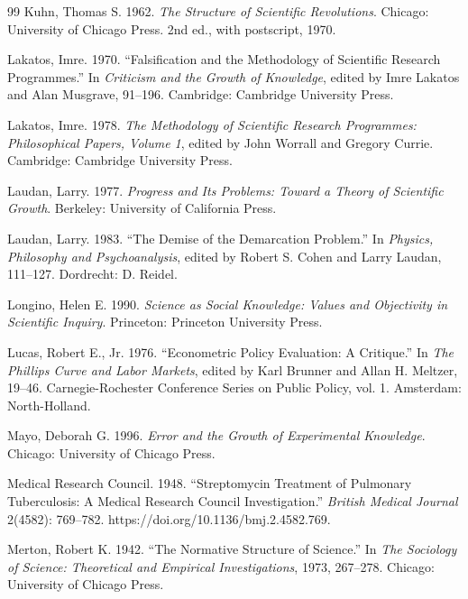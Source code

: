 \begin{thebibliography}{99}
Kuhn, Thomas S. 1962. \emph{The Structure of Scientific Revolutions}. Chicago: University of Chicago Press. 2nd ed., with postscript, 1970.

Lakatos, Imre. 1970. \enquote{Falsification and the Methodology of Scientific Research Programmes.} In \emph{Criticism and the Growth of Knowledge}, edited by Imre Lakatos and Alan Musgrave, 91--196. Cambridge: Cambridge University Press.

Lakatos, Imre. 1978. \emph{The Methodology of Scientific Research Programmes: Philosophical Papers, Volume 1}, edited by John Worrall and Gregory Currie. Cambridge: Cambridge University Press.

Laudan, Larry. 1977. \emph{Progress and Its Problems: Toward a Theory of Scientific Growth}. Berkeley: University of California Press.

Laudan, Larry. 1983. \enquote{The Demise of the Demarcation Problem.} In \emph{Physics, Philosophy and Psychoanalysis}, edited by Robert S. Cohen and Larry Laudan, 111--127. Dordrecht: D. Reidel.

Longino, Helen E. 1990. \emph{Science as Social Knowledge: Values and Objectivity in Scientific Inquiry}. Princeton: Princeton University Press.

Lucas, Robert E., Jr. 1976. \enquote{Econometric Policy Evaluation: A Critique.} In \emph{The Phillips Curve and Labor Markets}, edited by Karl Brunner and Allan H. Meltzer, 19--46. Carnegie-Rochester Conference Series on Public Policy, vol. 1. Amsterdam: North-Holland.

Mayo, Deborah G. 1996. \emph{Error and the Growth of Experimental Knowledge}. Chicago: University of Chicago Press.

Medical Research Council. 1948. \enquote{Streptomycin Treatment of Pulmonary Tuberculosis: A Medical Research Council Investigation.} \emph{British Medical Journal} 2(4582): 769--782. https://doi.org/10.1136/bmj.2.4582.769.

Merton, Robert K. 1942. \enquote{The Normative Structure of Science.} In \emph{The Sociology of Science: Theoretical and Empirical Investigations}, 1973, 267--278. Chicago: University of Chicago Press.


\end{thebibliography}
